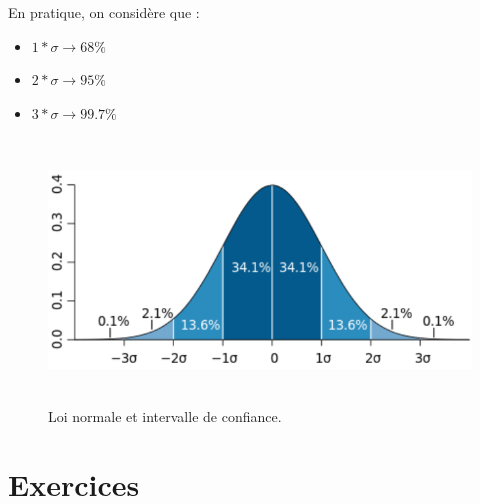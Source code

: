 En pratique, on considère que :
\begin{itemize}

    \item $1 * \sigma \rightarrow 68\% $
    \item $2 * \sigma \rightarrow 95\% $
    \item $3 * \sigma \rightarrow 99.7\%$

\end{itemize}


\begin{figure}
    \centering
    \includegraphics[height=7cm]{assets/figures/3_9_Loi_normale_et_intervale_de_confiance.PNG}
    \caption{Loi normale et intervalle de confiance.}
    \label{fig:3_9_Loi_normale_et_intervale_de_confiance}
\end{figure}

\section{Exercices }


